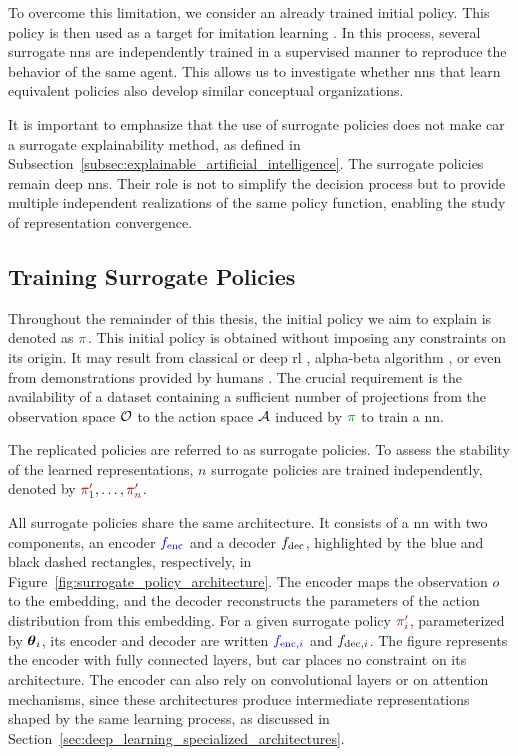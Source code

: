 To overcome this limitation, we consider an already trained initial policy.
This policy is then used as a target for imitation learning \parencite{pmlr-v15-ross11a}.
In this process, several surrogate \glspl{nn} are independently trained in a supervised manner to reproduce the behavior of the same agent.
This allows us to investigate whether \glspl{nn} that learn equivalent policies also develop similar conceptual organizations.

It is important to emphasize that the use of surrogate policies does not make \gls{car} a surrogate explainability method, as defined in Subsection~\ref{subsec:explainable_artificial_intelligence}.
The surrogate policies remain deep \glspl{nn}.
Their role is not to simplify the decision process but to provide multiple independent realizations of the same policy function, enabling the study of representation convergence.

\subsection{Training Surrogate Policies}

Throughout the remainder of this thesis, the initial policy we aim to explain is denoted as $\InitialPolicy$.
This initial policy is obtained without imposing any constraints on its origin.
It may result from classical or deep \gls{rl} \parencite{sutton2018reinforcement}, alpha-beta algorithm \parencite{knuth1975analysis}, or even from demonstrations provided by humans \parencite{pmlr-v9-ross10a}.
The crucial requirement is the availability of a dataset containing a sufficient number of projections from the observation space $\mathcal{O}$ to the action space $\mathcal{A}$ induced by $\InitialPolicy$ to train a \gls{nn}.

The replicated policies are referred to as surrogate policies.
To assess the stability of the learned representations, $n$ surrogate policies are trained independently, denoted by $\SurrogatePolicy{1}, \dots, \SurrogatePolicy{n}$.

All surrogate policies share the same architecture.
It consists of a \gls{nn} with two components, an encoder $\SurrogateEncoder$ and a decoder $\Decoder$, highlighted by the blue and black dashed rectangles, respectively, in Figure~\ref{fig:surrogate_policy_architecture}.
The encoder maps the observation $o$ to the embedding, and the decoder reconstructs the parameters of the action distribution from this embedding.
For a given surrogate policy $\SurrogatePolicy{i}$, parameterized by $\boldsymbol{\theta}_i$, its encoder and decoder are written $\SurrogateEncoder[i]$ and $\Decoder[i]$.
The figure represents the encoder with fully connected layers, but \gls{car} places no constraint on its architecture.
The encoder can also rely on convolutional layers or on attention mechanisms, since these architectures produce intermediate representations shaped by the same learning process, as discussed in Section~\ref{sec:deep_learning_specialized_architectures}.

